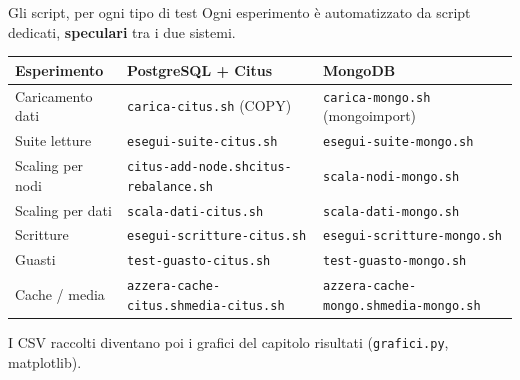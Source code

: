 \documentclass[aspectratio=169,11pt]{beamer}
\begin{document}
\begin{frame}{Gli script, per ogni tipo di test}
  \small Ogni esperimento è automatizzato da script dedicati, \textbf{speculari} tra i due sistemi.
  \vspace{0.4em}
  \centering
  \scriptsize
  \renewcommand{\arraystretch}{1.2}
  \begin{tabular}{@{}p{2.6cm} p{4.7cm} p{4.4cm}@{}}
    \toprule
    \textbf{Esperimento} & \textbf{PostgreSQL + Citus} & \textbf{MongoDB} \\
    \midrule
    Caricamento dati & \texttt{carica-citus.sh} (COPY) & \texttt{carica-mongo.sh} (mongoimport) \\
    Suite letture    & \texttt{esegui-suite-citus.sh}  & \texttt{esegui-suite-mongo.sh} \\
    Scaling per nodi & \texttt{citus-add-node.sh}\newline\texttt{citus-rebalance.sh} & \texttt{scala-nodi-mongo.sh} \\
    Scaling per dati & \texttt{scala-dati-citus.sh}    & \texttt{scala-dati-mongo.sh} \\
    Scritture        & \texttt{esegui-scritture-citus.sh} & \texttt{esegui-scritture-mongo.sh} \\
    Guasti           & \texttt{test-guasto-citus.sh}   & \texttt{test-guasto-mongo.sh} \\
    Cache / media    & \texttt{azzera-cache-citus.sh}\newline\texttt{media-citus.sh} & \texttt{azzera-cache-mongo.sh}\newline\texttt{media-mongo.sh} \\
    \bottomrule
  \end{tabular}
  \vspace{0.5em}
  \par I CSV raccolti diventano poi i grafici del capitolo risultati (\texttt{grafici.py}, matplotlib).
\end{frame}

\end{document}
